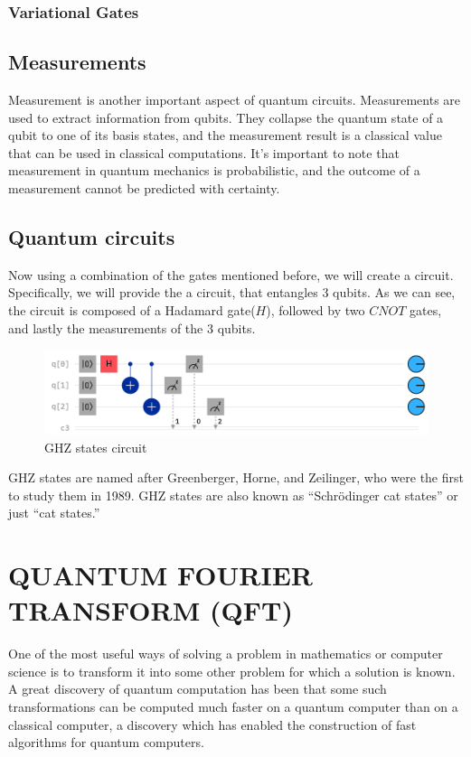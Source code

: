 \documentclass[inscr,ack,preface]{diphdthesis}
\begin{document}
\subsection{Variational Gates}




\section{Measurements}

Measurement is another important aspect of quantum circuits. Measurements are used to extract information from qubits. They collapse the quantum state of a qubit to one of its basis states, and the measurement result is a classical value that can be used in classical computations. It's important to note that measurement in quantum mechanics is probabilistic, and the outcome of a measurement cannot be predicted with certainty.

\section{Quantum circuits}

Now using a combination of the gates mentioned before, we will create a circuit. Specifically, we will provide the a circuit, that entangles 3 qubits. As we can see, the circuit is composed of a Hadamard gate($H$), followed by two $CNOT$ gates, and lastly the measurements of the 3 qubits. \cite{ibm}
\begin{figure}[ht]
    \includegraphics[width=1\textwidth]{ghz.png}
    \caption{GHZ states circuit}
    \label{fig:enter-label}
\end{figure}

GHZ states are named after Greenberger, Horne, and Zeilinger, who were the first to study them in 1989. GHZ states are also known as “Schrödinger cat states” or just “cat states.” \cite{ghz_ibm}

\chapter{QUANTUM FOURIER TRANSFORM (QFT)}

One of the most useful ways of solving a problem in mathematics or computer science is to transform it into some other problem for which a solution is known.  A great discovery of quantum computation has been that some such transformations can be computed much faster on a quantum computer than on a classical computer, a discovery which has enabled the construction of fast algorithms for quantum computers.
\end{document}
